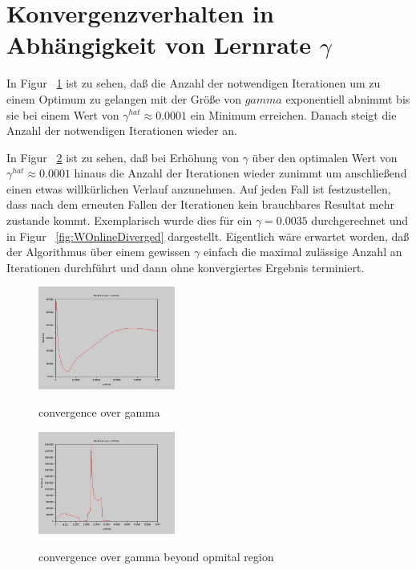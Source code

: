 \documentclass[]{report}
\begin{document}
\section{Konvergenzverhalten in Abh\"angigkeit von Lernrate $\gamma$}

In Figur ~\ref{fig:ConvergenceOverGamma} ist zu sehen, da{\ss} die Anzahl der notwendigen Iterationen um zu einem Optimum zu gelangen mit der Gr\"o{\ss}e von $gamma$ exponentiell abnimmt bis sie bei einem Wert von $\gamma^{hat} \approx 0.0001$ ein Minimum erreichen. Danach steigt die Anzahl der notwendigen Iterationen wieder an.

In Figur ~\ref{fig:ConvergenceOverGammaWDiverge} ist zu sehen, da{\ss} bei Erh\"ohung von $\gamma$ \"uber den optimalen Wert von $\gamma^{hat} \approx 0.0001$ hinaus die Anzahl der Iterationen wieder zunimmt um anschlie{\ss}end einen etwas willk\"urlichen Verlauf anzunehmen. Auf jeden Fall ist festzustellen, dass nach dem erneuten Fallen der Iterationen kein brauchbares Resultat mehr zustande kommt. Exemplarisch wurde dies f\"ur ein $\gamma=0.0035$ durchgerechnet und in Figur ~\ref{fig:WOnlineDiverged} dargestellt. Eigentlich w\"are erwartet worden, da{\ss} der Algorithmus \"uber einem gewissen $\gamma$ einfach die maximal zul\"assige Anzahl an Iterationen durchf\"uhrt und dann ohne konvergiertes Ergebnis terminiert.


\begin{figure}[h]
\centering
\includegraphics[width=0.4\textwidth]{./images/ConvergenceOverGamma.jpg} \\
\caption{convergence over gamma}
\label{fig:ConvergenceOverGamma}
\end{figure}

\begin{figure}[h]
\centering
\includegraphics[width=0.4\textwidth]{./images/ConvergenceOverGamma_w_diverge.jpg} \\
\caption{convergence over gamma beyond opmital region}
\label{fig:ConvergenceOverGammaWDiverge}
\end{figure}
\end{document}
